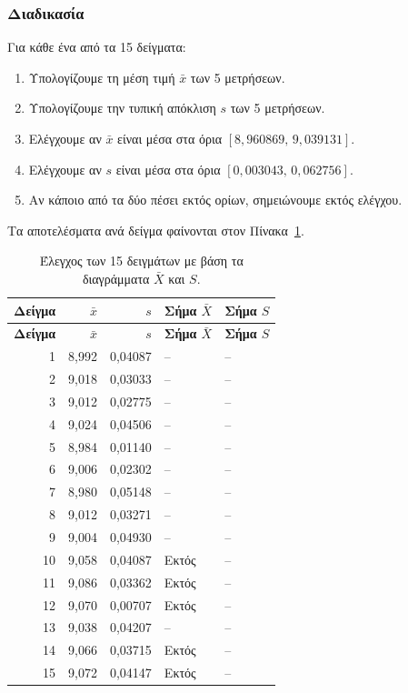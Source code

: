 \documentclass[12pt,a4paper]{article}
\begin{document}
\subsubsection*{Διαδικασία}

Για κάθε ένα από τα 15 δείγματα:

\begin{enumerate}[leftmargin=2.2em]
    \item Υπολογίζουμε τη μέση τιμή \(\bar x\) των 5 μετρήσεων.
    \item Υπολογίζουμε την τυπική απόκλιση \(s\) των 5 μετρήσεων.
    \item Ελέγχουμε αν \(\bar x\) είναι μέσα στα όρια \([8{,}960869,\,9{,}039131]\).
    \item Ελέγχουμε αν \(s\) είναι μέσα στα όρια \([0{,}003043,\,0{,}062756]\).
    \item Αν κάποιο από τα δύο πέσει εκτός ορίων, σημειώνουμε εκτός ελέγχου.
\end{enumerate}

Τα αποτελέσματα ανά δείγμα φαίνονται στον Πίνακα~\ref{tab:samples-v2}.

\begin{longtable}{rrrll}
\caption{Έλεγχος των 15 δειγμάτων με βάση τα διαγράμματα \(\bar X\) και \(S\).}
\label{tab:samples-v2}\\
\toprule
\textbf{Δείγμα} & \textbf{\(\bar x\)} & \textbf{\(s\)} & \textbf{Σήμα \(\bar X\)} & \textbf{Σήμα \(S\)} \\
\midrule
\endfirsthead
\toprule
\textbf{Δείγμα} & \textbf{\(\bar x\)} & \textbf{\(s\)} & \textbf{Σήμα \(\bar X\)} & \textbf{Σήμα \(S\)} \\
\midrule
\endhead
1  & 8,992 & 0,04087 & --  & -- \\
2  & 9,018 & 0,03033 & --  & -- \\
3  & 9,012 & 0,02775 & --  & -- \\
4  & 9,024 & 0,04506 & --  & -- \\
5  & 8,984 & 0,01140 & --  & -- \\
6  & 9,006 & 0,02302 & --  & -- \\
7  & 8,980 & 0,05148 & --  & -- \\
8  & 9,012 & 0,03271 & --  & -- \\
9  & 9,004 & 0,04930 & --  & -- \\
10 & 9,058 & 0,04087 & Εκτός & -- \\
11 & 9,086 & 0,03362 & Εκτός & -- \\
12 & 9,070 & 0,00707 & Εκτός & -- \\
13 & 9,038 & 0,04207 & --  & -- \\
14 & 9,066 & 0,03715 & Εκτός & -- \\
15 & 9,072 & 0,04147 & Εκτός & -- \\
\bottomrule
\end{longtable}
\end{document}
